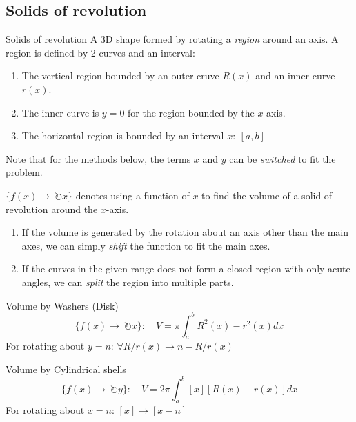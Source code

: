 \subsection{Solids of revolution}
\begin{definition}
    {Solids of revolution}
    A 3D shape formed by rotating a \emph{region} around an axis.
    \tcblower
    A region is defined by 2 curves and an interval:
    \begin{enumerate}
        \item The vertical region bounded by an outer cruve $R(x)$ and an inner curve $r(x)$.
        \item The inner curve is $y=0$ for the region bounded by the $x$-axis.
        \item The horizontal region is bounded by an interval $x:\ [a, b]$
    \end{enumerate}

    Note that for the methods below, the terms $x$ and $y$ can be \emph{switched} to fit the problem.

    $\{f(x)\to\ \circlearrowright x\}$ denotes using a function of $x$ to find the volume of a solid of revolution around the $x$-axis.
    \begin{enumerate}
        \item If the volume is generated by the rotation about an axis other than the main axes, we can simply \emph{shift} the function to fit the main axes.
        \item If the curves in the given range does not form a closed region with only acute angles, we can \emph{split} the region into multiple parts.
    \end{enumerate}
\end{definition}
\begin{theorem}
    {Volume by Washers (Disk)}
    \[\{f(x)\to\ \circlearrowright x\}:\quad V=\pi\int_{a}^{b}R^2(x)-r^2(x)dx\]
    For rotating about $y=n$: $\forall R/r(x)\to n-R/r(x)$
\end{theorem}
\begin{theorem}
    {Volume by Cylindrical shells}
    \[\{f(x)\to\ \circlearrowright y\}:\quad V=2\pi\int_{a}^{b}[x][R(x)-r(x)]dx\]
    For rotating about $x=n$: $[x]\to [x-n]$
\end{theorem}

